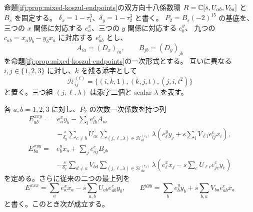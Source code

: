 \begin{theorem}
\label{ifj:thm:mixed-koszul-full-third}
命題\ref{ifj:prop:mixed-koszul-endpoints}の双方向十八係数環
$R=\mathbb C[s,U_{ab},V_{ba}]$ と $B_s$ を固定する。
$\delta_x=1-\tau_1^3$、$\delta_y=1-\tau_2^3$ と書く。
$P_2=B_s(-2)^{15}$ の基底を、三つの $x$ 関係に対応する
$e_a^x$、三つの $y$ 関係に対応する $e_b^y$、
九つの $c_{ab}=x_ay_b-y_bx_a$ に対応する $e_{ab}^c$ とし、
\[
       A_{ia}=(D_x)_{ia},\qquad B_{jb}=(D_y)_{jb}
\]
を命題\ref{ifj:prop:mixed-koszul-endpoints}の一次形式とする。
互いに異なる $i,j\in\{1,2,3\}$ に対し、$k$ を残る添字として
\begin{equation}\label{ifj:eq:mixed-d3-cycle-triples}
 \mathcal H^{(t)}_{ij}
  =\{(i,k,1),(k,j,t),(j,i,t^2)\}
\end{equation}
と置く。三つ組 $(j,\ell,\lambda)$ は添字二個と scalar
$\lambda$ を表す。

各 $a,b=1,2,3$ に対し、$P_2$ の次数一次係数を持つ列
\begin{equation}\label{ifj:eq:mixed-d3-nine-xxy}
\begin{aligned}
 E^{xxy}_{ab}={}&e_a^x y_b-\sum_i e_{ib}^c A_{ia}\\
 &-\frac{s}{\delta_y}\sum_{c\ne b}U_{ac}
  \sum_{(j,\ell,\lambda)\in\mathcal H^{(\tau_2)}_{cb}}
    \lambda\left(
       e_\ell^y y_j+s\sum_iV_{\ell i}e_{ij}^c x_i
                \right),
\end{aligned}
\end{equation}
\begin{equation}\label{ifj:eq:mixed-d3-nine-xyy}
\begin{aligned}
 E^{xyy}_{ba}={}&e_b^y x_a+\sum_j e_{aj}^c B_{jb}\\
 &-\frac{s}{\delta_x}\sum_{d\ne a}V_{bd}
  \sum_{(j,\ell,\lambda)\in\mathcal H^{(\tau_1)}_{da}}
    \lambda\left(
       e_\ell^x x_j-s\sum_eU_{\ell e}e_{je}^c y_e
               \right)
\end{aligned}
\end{equation}
を定める。さらに従来の二つの最上列を
\[
 E^{xxx}=\sum_a e_a^x x_a-s\sum_{a,b}U_{ab}e_{ab}^c y_b,
 \qquad
 E^{yyy}=\sum_b e_b^y y_b+s\sum_{b,a}V_{ba}e_{ab}^c x_a
\]
と書く。このとき次が成立する。


\end{theorem}
